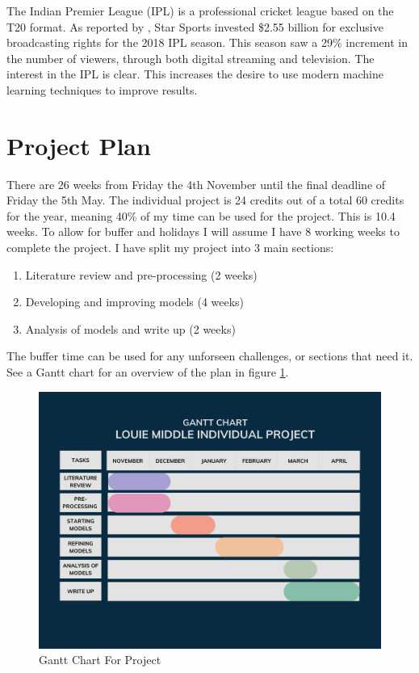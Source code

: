 \documentclass[12pt,a4paper]{report}
\theoremstyle{definition}
\begin{document}
The Indian Premier League (IPL) is a professional cricket league based on the T20 format.
As reported by \citet{ESPNcricinfo2018}, Star Sports invested \$2.55 billion for exclusive broadcasting rights for the 2018 IPL season. 
This season saw a 29\% increment in the number of viewers, through both digital streaming and television. 
The interest in the IPL is clear.
This increases the desire to use modern machine learning techniques to improve results.

\section{Project Plan}

There are 26 weeks from Friday the 4th November until the final deadline of Friday the 5th May. 
The individual project is 24 credits out of a total 60 credits for the year, meaning 40\% of my time can be used for the project. 
This is 10.4 weeks. 
To allow for buffer and holidays I will assume I have 8 working weeks to complete the project. 
I have split my project into 3 main sections:

\begin{enumerate}
    \item Literature review and pre-processing (2 weeks)
    \item Developing and improving models (4 weeks)
    \item Analysis of models and write up (2 weeks)
\end{enumerate}

The buffer time can be used for any unforseen challenges, or sections that need it. 
See a Gantt chart for an overview of the plan in figure \ref{fig:gantt_chart}.

\begin{figure}[H]
    \centering
    \includegraphics[width=\linewidth]{Gantt Chart.png}
    \caption{Gantt Chart For Project}
    \label{fig:gantt_chart}
\end{figure}
\end{document}
